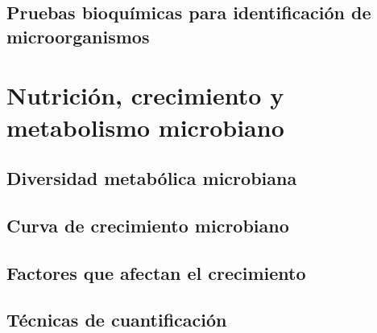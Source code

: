 \documentclass{../summarie}
\begin{document}
    \chapter{Pruebas bioquímicas para identificación de microorganismos}

\part{Nutrición, crecimiento y metabolismo microbiano}
    \chapter{Diversidad metabólica microbiana}
    \chapter{Curva de crecimiento microbiano}
    \chapter{Factores que afectan el crecimiento}
    \chapter{Técnicas de cuantificación}


\newpage 
\end{document}
